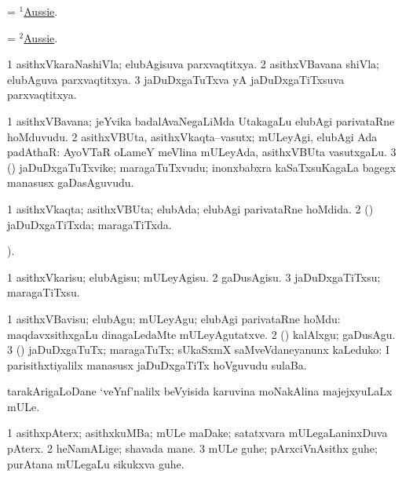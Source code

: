 \bentry
{}
\gl{\nA}
\bmng
= \hyperref{kandict_a.pdf}{A}{Aussie(1)}{$^1$Aussie}. 
\emng
\eentry

\bentry
{}
\gl{\gu}
\bmng
= \hyperref{kandict_a.pdf}{A}{Aussie(2)}{$^2$Aussie}. 
\emng
\eentry

\bentry
{}
\gl{\gu}
\bmng
\bnum
\num{1} asithxVkaraNashiVla; elubAgisuva parxvaqtitxya. 
\num{2} asithxVBavana shiVla; elubAguva parxvaqtitxya. 
\num{3} jaDuDxgaTuTxva yA jaDuDxgaTiTxsuva parxvaqtitxya. 
\enum
\emng
\eentry

\bentry
{}
\gl{\nA}
\bmng
\bnum
\num{1} asithxVBavana; jeYvika badalAvaNegaLiMda UtakagaLu elubAgi parivataRne hoMduvudu. 
\num{2} asithxVBUta, asithxVkaqta--vasutx; mULeyAgi, elubAgi Ada padAthaR:  AyoVTaR oLameY meVlina mULeyAda, asithxVBUta vasutxgaLu. 
\num{3} (\rUpa) jaDuDxgaTuTxvike; maragaTuTxvudu; inonxbabxra kaSaTxsuKagaLa bagegx manasusx gaDasAguvudu. 
\enum
\emng
\eentry

\bentry
{}
\gl{\gu}
\bmng
\bnum
\num{1} asithxVkaqta; asithxVBUta; elubAda; elubAgi parivataRne hoMdida. 
\num{2} (\rUpa) jaDuDxgaTiTxda; maragaTiTxda. 
\enum
\emng
\eentry

\bentry
{}
\gl{\kirx}
).

\noindent
\gl{\sakirx}
\bmng
\bnum
\num{1} asithxVkarisu; elubAgisu; mULeyAgisu. 
\num{2} gaDusAgisu. 
\num{3} jaDuDxgaTiTxsu; maragaTiTxsu. 
\enum
\emng

\noindent
\gl{\akirx}
\bmng
\bnum
\num{1} asithxVBavisu; elubAgu; mULeyAgu; elubAgi parivataRne hoMdu:  maqdavxsithxgaLu dinagaLedaMte mULeyAgutatxve. 
\num{2} (\rUpa) kalAlxgu; gaDusAgu. 
\num{3} (\rUpa) jaDuDxgaTuTx; maragaTuTx; sUkaSxmX saMveVdaneyanunx kaLeduko:  I parisithxtiyalilx manasusx jaDuDxgaTiTx hoVguvudu sulaBa. 
\enum
\emng
\eentry

\bentry
{}
\gl{\nA}
\bmng
tarakArigaLoDane `veYnf'nalilx beVyisida karuvina moNakAlina majejxyuLaLx mULe. 
\emng
\eentry

\bentry
{}
\gl{\nA}
\bmng
\bnum
\num{1} asithxpAterx; asithxkuMBa; mULe maDake; satatxvara mULegaLaninxDuva pAterx. 
\num{2} heNamALige; shavada mane. 
\num{3} mULe guhe; pArxciVnAsithx guhe; purAtana mULegaLu sikukxva guhe. 
\enum
\emng
\eentry

